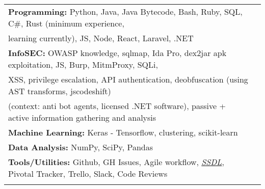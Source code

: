 \documentclass[letterpaper,11pt]{article}
\begin{document}
\vspace{-2pt}
	\begin{center}\begin{tabular*}{6.6in}{l@{\extracolsep{\fill}}r}
		\textbf{Programming:} Python, Java, Java Bytecode,
		  Bash, Ruby, SQL, C\#, Rust (minimum experience,\\ learning currently), JS, Node, React, Laravel, .NET\\
		\textbf{InfoSEC:} OWASP knowledge, sqlmap, Ida Pro, dex2jar apk exploitation, JS, Burp, MitmProxy, SQLi,\\ XSS, privilege escalation, API authentication, deobfuscation (using AST transforms, jscodeshift)\\ (context: anti bot agents, licensed .NET software), passive + active information gathering and analysis \\
		\textbf{Machine Learning:} Keras - Tensorflow, clustering, scikit-learn\\
		\textbf{Data Analysis:} NumPy, SciPy, Pandas\\
		\textbf{Tools/Utilities:} Github, GH Issues, Agile workflow, \href{https://www.owasp.org/index.php/OWASP_Secure_Software_Development_Lifecycle_Project}{\textit{SSDL}}, Pivotal Tracker, Trello, Slack, Code Reviews\\
		\vphantom{E}
\end{tabular*}
\end{center}\vspace*{-16pt}
\end{document}
